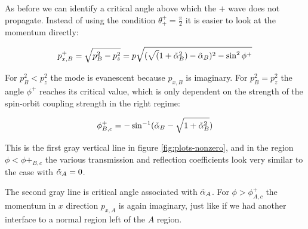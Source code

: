 As before we can identify a critical angle above which the $+$ wave
does not propagate. Instead of using the condition $\theta^+_+ =
\frac{\pi}{2}$ it is easier to look at the momentum directly:

\begin{align}
    p_{x,B}^+ = \sqrt{ p_B^2 - p_z^2} = p \sqrt{(\sqrt(1+\tilde \alpha_B^2) -
            \tilde \alpha_B)^2 - \sin^2 \phi^+}
\end{align}

For $p_B^2 < p_z^2$ the mode is evanescent because $p_{x,B}$ is
imaginary. For $p_B^2 = p_z^2$ the angle $\phi^+$ reaches its critical
value, which is only dependent on the strength of the spin-orbit
coupling strength in the right regime:

\begin{align}
    \phi^+_{B,c} = -\sin^{-1}(\tilde \alpha_B - \sqrt{1+\tilde \alpha_B^2})
\end{align}

This is the first gray vertical line in figure
\ref{fig:plots-nonzero}, and in the region $\phi < \phi+_{B,c}$ the various transmission and reflection
coefficients look very similar to the case with $\tilde \alpha_A = 0$.

The second gray line is critical angle associated with $\tilde \alpha_A$. For
$\phi > \phi^+_{A,c}$ the momentum in $x$ direction $p_{x,A}$ is again
imaginary, just like if we had another interface to a normal region
left of the $A$ region.

%
%

